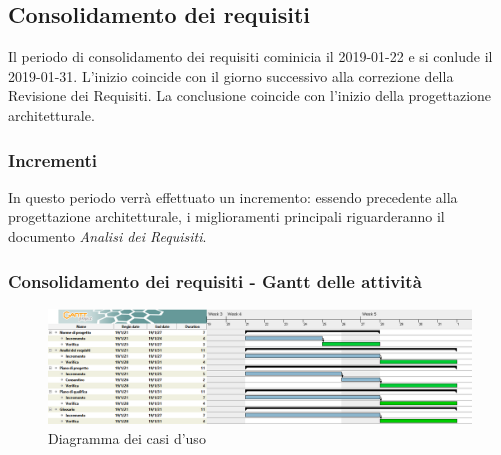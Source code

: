 \subsection{Consolidamento dei requisiti}
Il periodo di consolidamento dei requisiti cominicia il 2019-01-22 e si conlude il 2019-01-31. L'inizio coincide con il giorno successivo alla correzione della Revisione dei Requisiti. La conclusione coincide con l'inizio della progettazione architetturale. 
\subsubsection{Incrementi}
In questo periodo verrà effettuato un incremento: essendo precedente alla progettazione architetturale, i miglioramenti principali riguarderanno il documento \emph{Analisi dei Requisiti}.

\subsubsection{Consolidamento dei requisiti - Gantt delle attività}

\begin{figure} [H]
	\centering
	\includegraphics[scale=0.35]{Res/Gantt/Consolidamento}
	\caption{Diagramma dei casi d'uso}\label{}
\end{figure}

\pagebreak
